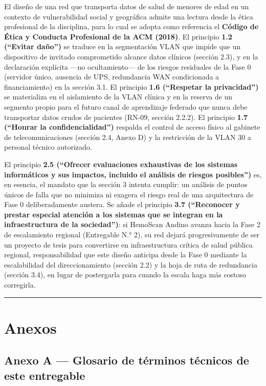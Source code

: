 \documentclass[11pt,a4paper]{article}
\begin{document}
El diseño de una red que transporta datos de salud de menores de edad en un contexto de vulnerabilidad social y geográfica admite una lectura desde la ética profesional de la disciplina, para lo cual se adopta como referencia el \textbf{Código de Ética y Conducta Profesional de la ACM (2018)}. El principio \textbf{1.2 (``Evitar daño'')} se traduce en la segmentación VLAN que impide que un dispositivo de invitado comprometido alcance datos clínicos (sección 2.3), y en la declaración explícita ---no ocultamiento--- de los riesgos residuales de la Fase 0 (servidor único, ausencia de UPS, redundancia WAN condicionada a financiamiento) en la sección 3.1. El principio \textbf{1.6 (``Respetar la privacidad'')} se materializa en el aislamiento de la VLAN clínica y en la reserva de un segmento propio para el futuro canal de aprendizaje federado que nunca debe transportar datos crudos de pacientes (RN-09, sección 2.2.2). El principio \textbf{1.7 (``Honrar la confidencialidad'')} respalda el control de acceso físico al gabinete de telecomunicaciones (sección 2.4, Anexo D) y la restricción de la VLAN 30 a personal técnico autorizado.

El principio \textbf{2.5 (``Ofrecer evaluaciones exhaustivas de los sistemas informáticos y sus impactos, incluido el análisis de riesgos posibles'')} es, en esencia, el mandato que la sección 3 intenta cumplir: un análisis de puntos únicos de falla que no minimiza ni exagera el riesgo real de una arquitectura de Fase 0 deliberadamente austera. Se añade el principio \textbf{3.7 (``Reconocer y prestar especial atención a los sistemas que se integran en la infraestructura de la sociedad'')}: si HemoScan Andino avanza hacia la Fase 2 de escalamiento regional (Entregable N.° 2), su red dejará progresivamente de ser un proyecto de tesis para convertirse en infraestructura crítica de salud pública regional, responsabilidad que este diseño anticipa desde la Fase 0 mediante la escalabilidad del direccionamiento (sección 2.2) y la hoja de ruta de redundancia (sección 3.4), en lugar de postergarla para cuando la escala haga más costoso corregirla.

\begin{center}\rule{0.5\linewidth}{0.5pt}\end{center}

\section{Anexos}\label{anexos}

\subsection{Anexo A --- Glosario de términos técnicos de este entregable}\label{anexo-a-glosario-de-tuxe9rminos-tuxe9cnicos-de-este-entregable}
\end{document}
